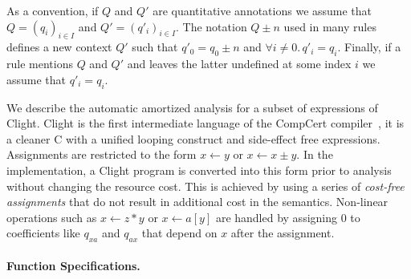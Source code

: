 \documentclass[nocopyrightspace,preprint,pldi]{sigplanconf-pldi15}
\newcommand{\ifshort}[2]{\ifx\fullversion\undefined{#1}\else{#2}\fi}
\newcommand{\paraskip}[0]{\ifshort{\vspace{-4pt}}{}}
\begin{document}

As a convention, if $Q$ and $Q'$ are quantitative annotations
we assume that $Q = (q_i)_{i\in I}$ and $Q' = (q'_i)_{i \in I}$.
The notation $Q \pm n$ used in many rules defines a new context $Q'$
such that $q'_0 = q_0 \pm n$ and $\forall i \neq 0 .\, q'_i = q_i$.
%
%
Finally, if a rule mentions $Q$ and $Q'$
and leaves the latter undefined at some index $i$ we assume that $q'_i = q_i$.

We describe the automatic amortized analysis for a subset of
expressions of Clight.  Clight is the first intermediate
language of the CompCert compiler~\cite{CompcertCACM}, it
is a cleaner C with a unified looping construct and
side-effect free expressions.
Assignments are restricted to the form $x \gets
y$ or $x \gets x \pm y$.  In the implementation, a Clight
program is converted into this form prior to analysis without changing
the resource cost.  This is achieved by using a series of \emph{cost-free
  assignments} that do not result in additional cost in the
semantics.  Non-linear operations such as $x \gets z*y$ or $x \gets
a[y]$ are handled by assigning $0$ to coefficients
like $q_{xa}$ and $q_{ax}$ that depend on $x$ after the assignment.

\paraskip
\paragraph{Function Specifications.}
\end{document}
